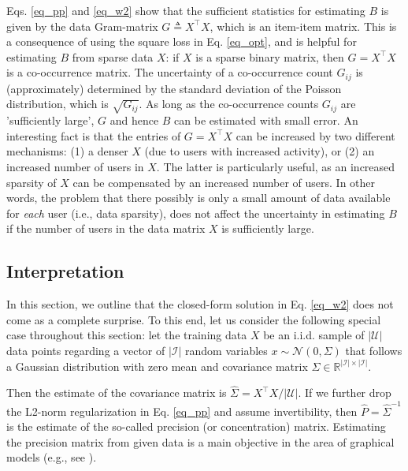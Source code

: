 \documentclass[sigconf]{acmart}
\newcommand{\W}{B}
\newcommand{\X}{X}
\newcommand{\RR}{\mathbb{R}}
\newcommand{\I}{\mathcal{ I}}
\newcommand{\UU}{\mathcal{U}}
\newcommand{\PP}{\hat{P}}
\newcommand{\N}{\mathcal{N}}
\begin{document}
Eqs. \ref{eq_pp} and \ref{eq_w2} show that the sufficient statistics for estimating $\W$ is given by the data Gram-matrix $G \triangleq \X^\top \X$, which is an item-item matrix. This is a consequence of using the square loss in Eq. \ref{eq_opt}, and is helpful for  estimating $\W$ from sparse data $\X$: if $\X$ is a sparse binary matrix, then $G=\X^\top \X$ is a co-occurrence matrix. The uncertainty of a co-occurrence count $G_{ij}$ is (approximately) determined by the standard deviation of the Poisson distribution, which is $\sqrt{G_{ij}}$. As long as the co-occurrence counts $G_{ij}$ are 'sufficiently large', $G$ and hence $\W$ can be estimated with small error. An interesting fact is that the entries of $G=\X^\top \X$ can be increased by two different mechanisms: (1) a denser $\X$ (due to users with increased activity), or (2) an increased number of  users in $\X$. The latter is particularly useful, as an increased sparsity of $\X$ can be compensated by an increased number of users. In other words, the problem that there possibly is only a small amount of data available for \emph{each} user (i.e., data sparsity), does not affect the uncertainty in  estimating  $\W$ if the number of users in the data matrix $\X$ is sufficiently large.   
\subsection{Interpretation}
\label{sec_interpretation}
In this section, we outline that the closed-form solution in Eq. \ref{eq_w2} does not come as  a complete surprise. To this end, let us consider the following special case throughout this section: let  the training data $\X$ be an i.i.d. sample of $|\UU|$ data points regarding a vector of $|\I|$ random variables $x\sim \N(0,\Sigma)$ that follows a Gaussian distribution with zero mean and covariance matrix $\Sigma \in \RR^{|\I|\times |\I|}$.

Then  the  estimate of the covariance matrix is $\hat{\Sigma}=\X^\top \X / |\UU|$. If we further drop the L2-norm regularization in Eq. \ref{eq_pp} and assume  invertibility, then  $\PP = \hat{\Sigma}^{-1}$ is the estimate of the so-called precision (or concentration) matrix. 
 Estimating the precision matrix from given data is a  main objective in  the area of graphical models (e.g., see \cite{lauritzenbuch96}).
\end{document}
